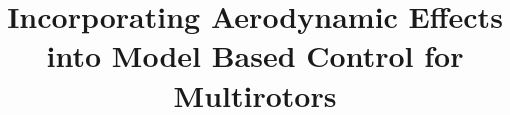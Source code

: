 \documentclass[10pt,twoside,a4paper]{report}
\begin{document}
\newcommand{\E}{\mathrm{E}}
\newcommand{\Var}{\mathrm{Var}}
\newcommand*\mean[1]{\overline{#1}}
\renewcommand{\d}[1]{\ensuremath{\operatorname{d}\!{#1}}}
\newcommand{\norm}[1]{\left\lVert#1\right\rVert}


\newlength\figureheight 
\newlength\figurewidth
\setlength{} 
\setlength\figureheight{0.6\figurewidth} 


\title{Incorporating Aerodynamic Effects into Model Based Control
for Multirotors}



\projectYear{\the\year} %

\maketitle
\pagestyle{plain}

\pagestyle{empty}




\setcounter{tocdepth}{2}

\tableofcontents
\cleardoublepage


\cleardoublepage

\cleardoublepage

\cleardoublepage
\end{document}
